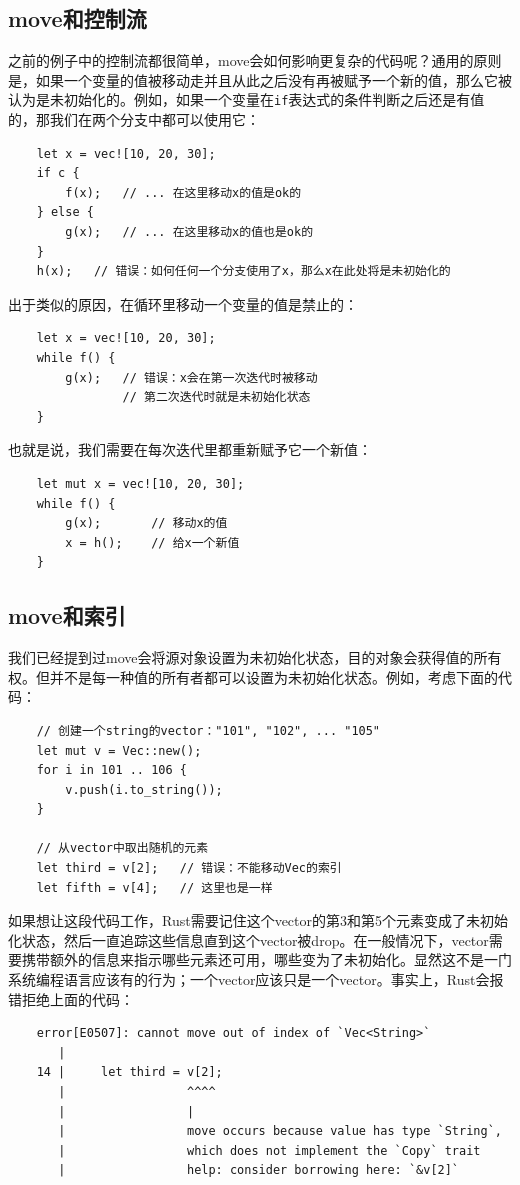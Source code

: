\subsection{move和控制流}
之前的例子中的控制流都很简单，move会如何影响更复杂的代码呢？通用的原则是，如果一个变量的值被移动走并且从此之后没有再被赋予一个新的值，那么它被认为是未初始化的。例如，如果一个变量在\texttt{if}表达式的条件判断之后还是有值的，那我们在两个分支中都可以使用它：
\begin{verbatim}
    let x = vec![10, 20, 30];
    if c {
        f(x);   // ... 在这里移动x的值是ok的
    } else {
        g(x);   // ... 在这里移动x的值也是ok的
    }
    h(x);   // 错误：如何任何一个分支使用了x，那么x在此处将是未初始化的
\end{verbatim}

出于类似的原因，在循环里移动一个变量的值是禁止的：
\begin{verbatim}
    let x = vec![10, 20, 30];
    while f() {
        g(x);   // 错误：x会在第一次迭代时被移动
                // 第二次迭代时就是未初始化状态 
    }
\end{verbatim}

也就是说，我们需要在每次迭代里都重新赋予它一个新值：
\begin{verbatim}
    let mut x = vec![10, 20, 30];
    while f() {
        g(x);       // 移动x的值
        x = h();    // 给x一个新值
    }
\end{verbatim}

\subsection{move和索引}

我们已经提到过move会将源对象设置为未初始化状态，目的对象会获得值的所有权。但并不是每一种值的所有者都可以设置为未初始化状态。例如，考虑下面的代码：
\begin{verbatim}
    // 创建一个string的vector："101", "102", ... "105"
    let mut v = Vec::new();
    for i in 101 .. 106 {
        v.push(i.to_string());
    }

    // 从vector中取出随机的元素
    let third = v[2];   // 错误：不能移动Vec的索引
    let fifth = v[4];   // 这里也是一样
\end{verbatim}

如果想让这段代码工作，Rust需要记住这个vector的第3和第5个元素变成了未初始化状态，然后一直追踪这些信息直到这个vector被drop。在一般情况下，vector需要携带额外的信息来指示哪些元素还可用，哪些变为了未初始化。显然这不是一门系统编程语言应该有的行为；一个vector应该只是一个vector。事实上，Rust会报错拒绝上面的代码：
\begin{verbatim}
    error[E0507]: cannot move out of index of `Vec<String>`
       |
    14 |     let third = v[2];
       |                 ^^^^
       |                 |
       |                 move occurs because value has type `String`,
       |                 which does not implement the `Copy` trait
       |                 help: consider borrowing here: `&v[2]`
\end{verbatim}

